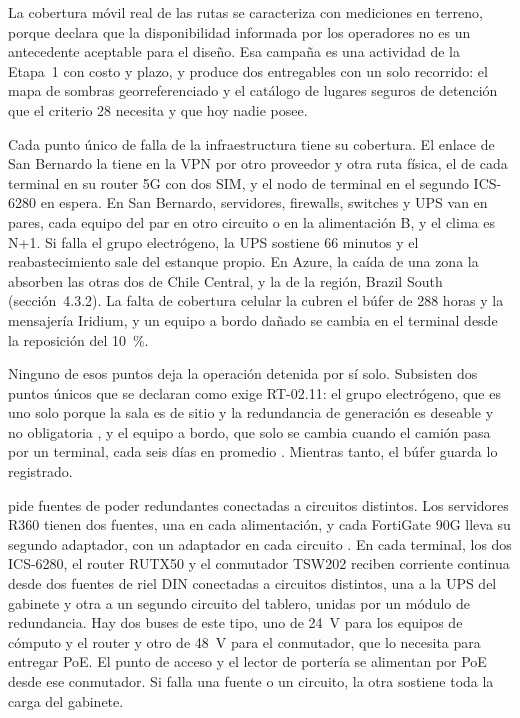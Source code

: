 La cobertura móvil real de las rutas se caracteriza con mediciones en terreno, porque
 declara que la disponibilidad informada por los operadores no es un antecedente
aceptable para el diseño. Esa campaña es una actividad de la Etapa~1 con costo y plazo, y produce dos
entregables con un solo recorrido: el mapa de sombras georreferenciado y el catálogo de lugares seguros
de detención que el criterio 28 necesita y que hoy nadie posee. 

Cada punto único de falla de la infraestructura tiene su cobertura. El enlace de San Bernardo la tiene
en la VPN por otro proveedor y otra ruta física, el de cada terminal en su router 5G con dos SIM, y el
nodo de terminal en el segundo ICS-6280 en espera. En San Bernardo, servidores, firewalls, switches y
UPS van en pares, cada equipo del par en otro circuito o en la alimentación B, y el clima es N+1. Si
falla el grupo electrógeno, la UPS sostiene 66 minutos y el reabastecimiento sale del estanque propio.
En Azure, la caída de una zona la absorben las otras dos de Chile Central, y la de la región, Brazil
South (sección~4.3.2). La falta de cobertura celular la cubren el búfer de 288 horas y la mensajería
Iridium, y un equipo a bordo dañado se cambia en el terminal desde la reposición del 10~\%.

Ninguno de esos puntos deja la operación detenida por sí solo. Subsisten dos puntos únicos que se
declaran como exige RT-02.11: el grupo electrógeno, que es uno solo porque la sala es de sitio y la
redundancia de generación es deseable y no obligatoria , y el equipo a bordo,
que solo se cambia cuando el camión pasa por un terminal, cada seis días en promedio
. Mientras tanto, el búfer guarda lo registrado.

 pide fuentes de poder redundantes conectadas a circuitos distintos. Los servidores
R360 tienen dos fuentes, una en cada alimentación, y cada FortiGate 90G lleva su segundo adaptador, con
un adaptador en cada circuito \parencite{fortinet_fg90g}. En cada terminal, los dos ICS-6280, el router
RUTX50 y el conmutador TSW202 reciben corriente continua desde dos fuentes de riel DIN conectadas a
circuitos distintos, una a la UPS del gabinete y otra a un segundo circuito del tablero, unidas por un
módulo de redundancia. Hay dos buses de este tipo, uno de 24~V para los equipos de cómputo y el router y
otro de 48~V para el conmutador, que lo necesita para entregar PoE. El punto de acceso y el lector de
portería se alimentan por PoE desde ese conmutador. Si falla una fuente o un circuito, la otra sostiene
toda la carga del gabinete.

